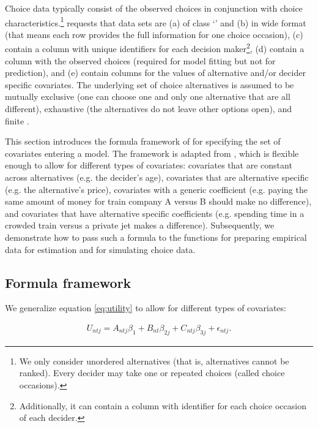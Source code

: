 \documentclass[article]{jss}
\newcommand{\class}[1]{`\code{#1}'}
\newcommand{\fct}[1]{\code{#1()}}
\begin{document}
Choice data typically consist of the observed choices in conjunction with choice characteristics.\footnote{We only consider unordered alternatives (that is, alternatives cannot be ranked). Every decider may take one or repeated choices (called choice occasions).}  requests that data sets are (a) of class \class{data.frame} and (b) in wide format (that means each row provides the full information for one choice occasion), (c) contain a column with unique identifiers for each decision maker\footnote{Additionally, it can contain a column with identifier for each choice occasion of each decider.}, (d) contain a column with the observed choices (required for model fitting but not for prediction), and (e) contain columns for the values of alternative and/or decider specific covariates. The underlying set of choice alternatives is assumed to be mutually exclusive (one can choose one and only one alternative that are all different), exhaustive (the alternatives do not leave other options open), and finite \citep{Train:2009}.

This section introduces the formula framework of  for specifying the set of covariates entering a model. The framework is adapted from , which is flexible enough to allow for different types of covariates: covariates that are constant across alternatives (e.g. the decider's age), covariates that are alternative specific (e.g. the alternative's price), covariates with a generic coefficient (e.g. paying the same amount of money for train company A versus B should make no difference), and covariates that have alternative specific coefficients (e.g. spending time in a crowded train versus a private jet makes a difference). Subsequently, we demonstrate how to pass such a formula to the functions \fct{prepare\_data} for preparing empirical data for estimation and \fct{simulate\_choices} for simulating choice data.

\subsection{Formula framework} \label{subsec:formula}

We generalize equation \eqref{eq:utility} to allow for different types of covariates:

\begin{align}
  \label{eq:utility_gen}
  U_{ntj} = A_{ntj} \beta_1 + B_{nt} \beta_{2j} + C_{ntj} \beta_{3j} + \epsilon_{ntj}.
\end{align}
\end{document}
